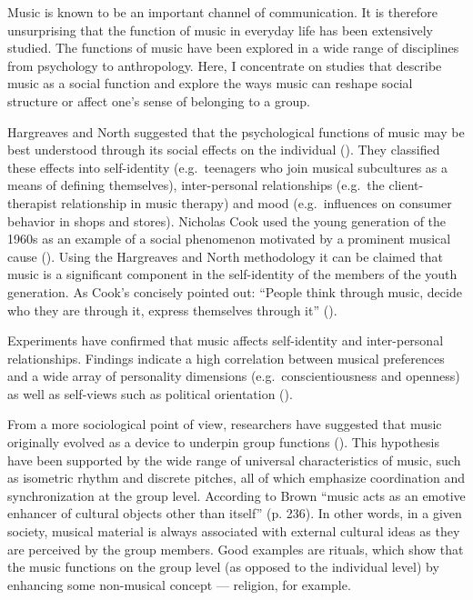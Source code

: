 \documentclass[a4paper,11pt]{article}
\begin{document}
Music is known to be an important channel of communication.
It is therefore unsurprising that the function of music in everyday life has been extensively studied.
The functions of music have been explored in a wide range of disciplines from psychology to anthropology.
Here, I concentrate on studies that describe music as a social function and explore the ways music can reshape social structure or affect one's sense of belonging to a group.

Hargreaves and North suggested that the psychological functions of music may be best understood through its social effects on the individual (\cite*{hargreaves99}).
They classified these effects into self-identity (e.g.\ teenagers who join musical subcultures as a means of defining themselves), inter-personal relationships (e.g.\ the client-therapist relationship in music therapy) and mood (e.g.\ influences on consumer behavior in shops and stores).
Nicholas Cook used the young generation of the 1960s as an example of a social phenomenon motivated by a prominent musical cause (\cite*[p. 5]{cook00}).
Using the Hargreaves and North methodology it can be claimed that music is a significant component in the self-identity of the members of the youth generation.
As Cook's concisely pointed out: ``People think through music, decide who they are through it, express themselves through it'' (\cite*{cook00}).

Experiments have confirmed that music affects self-identity and inter-personal relationships.
Findings indicate a high correlation between musical preferences and a wide array of personality dimensions (e.g.\ conscientiousness and openness) as well as self-views such as political orientation (\cite{rentfrow03}).

From a more sociological point of view, researchers have suggested that music originally evolved as a device to underpin group functions (\cite{Brown2000}).
This hypothesis have been supported by the wide range of universal characteristics of music, such as isometric rhythm and discrete pitches, all of which emphasize coordination and synchronization at the group level.
According to Brown ``music acts as an emotive enhancer of cultural objects other than itself'' (p. 236).
In other words, in a given society, musical material is always associated with external cultural ideas as they are perceived by the group members.
Good examples are rituals, which show that the music functions on the group level (as opposed to the individual level) by enhancing some non-musical concept ---  religion, for example.
\end{document}
